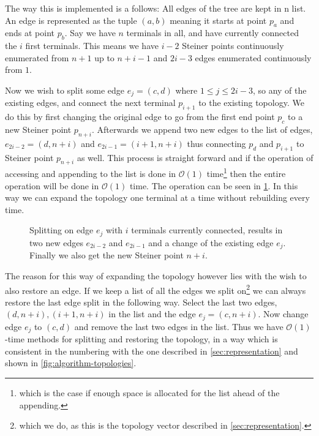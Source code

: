 The way this is implemented is a follows: All edges of the tree are kept in n
list. An edge is represented as the tuple $(a, b)$ meaning it starts at
point $p_a$ and ends at point $p_b$. Say we have $n$ terminals in all, and have
currently connected the $i$ first terminals. This means we have $i-2$ Steiner points
continuously enumerated from $n+1$ up to $n+i-1$ and $2i-3$ edges enumerated
continuously from $1$.

Now we wish to split some edge $e_j = (c, d)$ where $1 \le j \le 2i-3$, so any
of the existing edges, and connect the next terminal $p_{i+1}$ to the existing
topology. We do this by first changing the original edge to go from the first
end point $p_c$ to a new Steiner point $p_{n+i}$. Afterwards we append two new
edges to the list of edges, $e_{2i-2} = (d, n+i)$ and $e_{2i-1} = (i+1, n+i)$
thus connecting $p_d$ and $p_{i+1}$ to Steiner point $p_{n+i}$ as well. This
process is straight forward and if the operation of accessing and appending to
the list is done in $\mathcal{O}(1)$ time\footnote{which is the case if enough
  space is allocated for the list ahead of the appending.} then the entire
operation will be done in $\mathcal{O}(1)$ time. The operation can be seen in
\cref{fig:splitting-topology}. In this way we can expand the topology one
terminal at a time without rebuilding every time.

\begin{figure}[htbp]
  \centering
  
  \caption[Implementation of topology splitting]{Splitting on edge $e_j$ with
    $i$ terminals currently connected, results in two new edges $e_{2i-2}$ and
    $e_{2i-1}$ and a change of the existing edge $e_j$. Finally we also get the new
    Steiner point $n+i$.\label{fig:splitting-topology}}
\end{figure}

The reason for this way of expanding the topology however lies with the wish to
also restore an edge. If we keep a list of all the edges we split
on\footnote{which we do, as this is the topology vector described in
  \cref{sec:representation}.} we can always restore the last edge split in the
following way. Select the last two edges, $(d, n+i), (i+1, n+i)$ in the list and
the edge $e_j = (c, n+i)$. Now change edge $e_j$ to $(c, d)$ and remove the last
two edges in the list. Thus we have $\mathcal{O}(1)$-time methods for splitting and
restoring the topology, in a way which is consistent in the numbering with the
one described in \cref{sec:representation} and shown in
\cref{fig:algorithm-topologies}.

